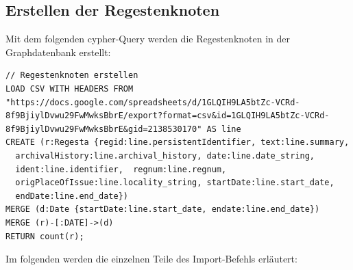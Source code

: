 \documentclass[ngerman,]{scrreprt}
\begin{document}
\subsection{Erstellen der Regestenknoten}\label{erstellen-der-regestenknoten}

Mit dem folgenden cypher-Query werden die Regestenknoten in der Graphdatenbank erstellt:

\begin{verbatim}
// Regestenknoten erstellen
LOAD CSV WITH HEADERS FROM "https://docs.google.com/spreadsheets/d/1GLQIH9LA5btZc-VCRd-8f9BjiylDvwu29FwMwksBbrE/export?format=csv&id=1GLQIH9LA5btZc-VCRd-8f9BjiylDvwu29FwMwksBbrE&gid=2138530170" AS line
CREATE (r:Regesta {regid:line.persistentIdentifier, text:line.summary,
  archivalHistory:line.archival_history, date:line.date_string,  
  ident:line.identifier,  regnum:line.regnum,
  origPlaceOfIssue:line.locality_string, startDate:line.start_date,
  endDate:line.end_date})
MERGE (d:Date {startDate:line.start_date, endate:line.end_date})
MERGE (r)-[:DATE]->(d)
RETURN count(r);
\end{verbatim}

Im folgenden werden die einzelnen Teile des Import-Befehls erläutert:
\end{document}
